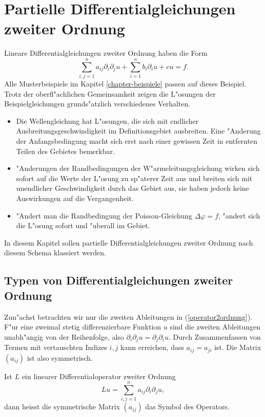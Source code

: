 \chapter{Partielle Differentialgleichungen zweiter Ordnung\label{chapter-2ordnung}}
Lineare Differentialgleichungen zweiter Ordnung haben die Form
\begin{equation}
\sum_{i,j=1}^na_{ij}\partial_i\partial_j u+\sum_{i=1}^nb_i\partial_i u+cu=f.
\label{operator2ordnung}
\end{equation}
Alle Musterbeispiele im Kapitel \ref{chapter-beispiele} passen auf dieses 
Beispiel. Trotz der oberfl"achlichen Gemeinsamkeit zeigen die L"osungen
der Beispielgleichungen grunds"atzlich verschiedenes Verhalten.
\begin{itemize}
\item Die Wellengleichung hat L"osungen, die sich mit endlicher
Ausbreitungsgeschwindigkeit im Definitionsgebiet ausbreiten. Eine "Anderung
der Anfangsbedingung macht sich erst nach einer gewissen Zeit in
entfernten Teilen des Gebietes bemerkbar.
\item "Anderungen der Randbedingungen der W"armeleitungsgleichung wirken
sich sofort auf die Werte der L"osung zu sp"aterer Zeit aus und breiten
sich mit unendlicher Geschwindigkeit durch das Gebiet aus, sie haben jedoch
keine Auswirkungen auf die Vergangenheit.
\item "Andert man die Randbedingung der Poisson-Gleichung $\Delta \varphi=f$,
"andert sich die L"osung sofort und "uberall im Gebiet.
\end{itemize}
In diesem Kapitel sollen partielle Differentialgleichungen zweiter Ordnung
nach diesem Schema klassiert werden.

\section{Typen von Differentialgleichungen zweiter Ordnung}
Zun"achst betrachten wir nur die zweiten Ableitungen in (\ref{operator2ordnung}).
F"ur eine zweimal stetig differenzierbare Funktion $u$ sind die zweiten
Ableitungen unabh"angig von der Reihenfolge, also
$\partial_i\partial_ju=\partial_j\partial_iu$.
Durch Zusammenfassen von Termen mit vertauschten Indizes $i,j$ kann 
erreichen, dass $a_{ij}=a_{ji}$ ist.
Die Matrix $(a_{ij})$ ist also symmetrisch.

\begin{definition}Ist $L$ ein linearer Differentialoperator zweiter Ordnung
\[
Lu=\sum_{i,j=1}^na_{ij}\partial_i\partial_ju,
\]
dann heisst die symmetrische Matrix
$(a_{ij})$ das Symbol des Operators.
\end{definition}

